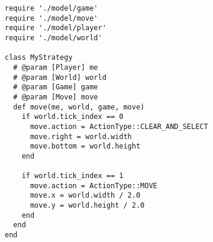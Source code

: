 \begin{verbatim}
require './model/game'
require './model/move'
require './model/player'
require './model/world'

class MyStrategy
  # @param [Player] me
  # @param [World] world
  # @param [Game] game
  # @param [Move] move
  def move(me, world, game, move)
    if world.tick_index == 0
      move.action = ActionType::CLEAR_AND_SELECT
      move.right = world.width
      move.bottom = world.height
    end

    if world.tick_index == 1
      move.action = ActionType::MOVE
      move.x = world.width / 2.0
      move.y = world.height / 2.0
    end
  end
end
\end{verbatim}
